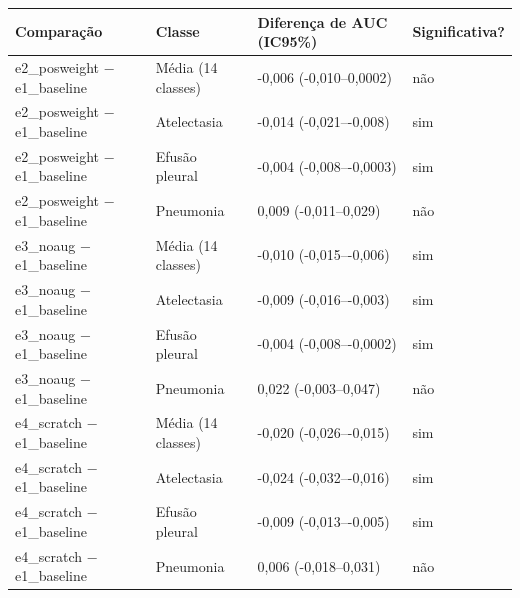 \begin{tabular}{llll}
\toprule
Comparação & Classe & Diferença de AUC (IC95\%) & Significativa? \\
\midrule
e2\_posweight − e1\_baseline & Média (14 classes) & -0,006 (-0,010–0,0002) & não \\
e2\_posweight − e1\_baseline & Atelectasia & -0,014 (-0,021–-0,008) & sim \\
e2\_posweight − e1\_baseline & Efusão pleural & -0,004 (-0,008–-0,0003) & sim \\
e2\_posweight − e1\_baseline & Pneumonia & 0,009 (-0,011–0,029) & não \\
e3\_noaug − e1\_baseline & Média (14 classes) & -0,010 (-0,015–-0,006) & sim \\
e3\_noaug − e1\_baseline & Atelectasia & -0,009 (-0,016–-0,003) & sim \\
e3\_noaug − e1\_baseline & Efusão pleural & -0,004 (-0,008–-0,0002) & sim \\
e3\_noaug − e1\_baseline & Pneumonia & 0,022 (-0,003–0,047) & não \\
e4\_scratch − e1\_baseline & Média (14 classes) & -0,020 (-0,026–-0,015) & sim \\
e4\_scratch − e1\_baseline & Atelectasia & -0,024 (-0,032–-0,016) & sim \\
e4\_scratch − e1\_baseline & Efusão pleural & -0,009 (-0,013–-0,005) & sim \\
e4\_scratch − e1\_baseline & Pneumonia & 0,006 (-0,018–0,031) & não \\
\bottomrule
\end{tabular}
